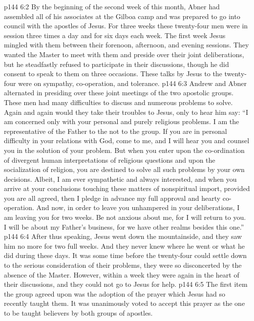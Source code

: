 \vs p144 6:2 By the beginning of the second week of this month, Abner had assembled all of his associates at the Gilboa camp and was prepared to go into council with the apostles of Jesus. For three weeks these twenty\hyp{}four men were in session three times a day and for six days each week. The first week Jesus mingled with them between their forenoon, afternoon, and evening sessions. They wanted the Master to meet with them and preside over their joint deliberations, but he steadfastly refused to participate in their discussions, though he did consent to speak to them on three occasions. These talks by Jesus to the twenty\hyp{}four were on sympathy, co\hyp{}operation, and tolerance.
\vs p144 6:3 Andrew and Abner alternated in presiding over these joint meetings of the two apostolic groups. These men had many difficulties to discuss and numerous problems to solve. Again and again would they take their troubles to Jesus, only to hear him say: \textcolor{ubdarkred}{“I am concerned only with your personal and purely religious problems. I am the representative of the Father to the  not to the group. If you are in personal difficulty in your relations with God, come to me, and I will hear you and counsel you in the solution of your problem. But when you enter upon the co\hyp{}ordination of divergent human interpretations of religious questions and upon the socialization of religion, you are destined to solve all such problems by your own decisions. Albeit, I am ever sympathetic and always interested, and when you arrive at your conclusions touching these matters of nonspiritual import, provided you are all agreed, then I pledge in advance my full approval and hearty co\hyp{}operation. And now, in order to leave you unhampered in your deliberations, I am leaving you for two weeks. Be not anxious about me, for I will return to you. I will be about my Father’s business, for we have other realms besides this one.”}
\vs p144 6:4 After thus speaking, Jesus went down the mountainside, and they saw him no more for two full weeks. And they never knew where he went or what he did during these days. It was some time before the twenty\hyp{}four could settle down to the serious consideration of their problems, they were so disconcerted by the absence of the Master. However, within a week they were again in the heart of their discussions, and they could not go to Jesus for help.
\vs p144 6:5 \pc The first item the group agreed upon was the adoption of the prayer which Jesus had so recently taught them. It was unanimously voted to accept this prayer as the one to be taught believers by both groups of apostles.
